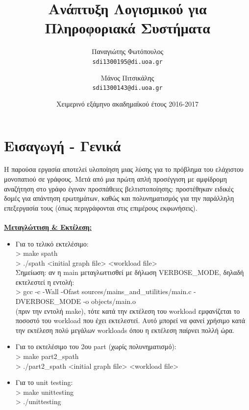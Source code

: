 \documentclass[11pt]{article}
\title{Ανάπτυξη Λογισμικού για Πληροφοριακά Συστήματα}
\author{Παναγιώτης Φωτόπουλος\\
  \texttt{sdi1300195@di.uoa.gr}
  \and Μάνος Πιτσικάλης\\
  \texttt{sdi1300143@di.uoa.gr}}
\date{Χειμερινό εξάμηνο ακαδημαϊκού έτους 2016-2017}
\begin{document}
\maketitle


\section{Εισαγωγή - Γενικά}
Η παρούσα εργασία αποτελεί υλοποίηση μιας λύσης για το πρόβλημα του ελάχιστου μονοπατιού σε γράφους. Μετά από μια πρώτη απλή προσέγγιση με αμφίδρομη αναζήτηση στο γράφο έγιναν προσπάθειες βελτιστοποίησης: προστέθηκαν ειδικές δομές για απάντηση ερωτημάτων, καθώς και πολυνηματισμός για την παράλληλη επεξεργασία τους (όπως περιγράφονται στις επιμέρους εκφωνήσεις).\\\\
\textbf{\underline{Μεταγλώττιση \& Εκτέλεση:}}
\begin{itemize}
\item Για το τελικό εκτελέσιμο:\\
> make spath\\
> ./spath <initial graph file> <workload file>\\
Σημείωση: αν η main μεταγλωττισθεί με δήλωση VERBOSE\_MODE, δηλαδή εκτελεστεί η εντολή: \\
> gcc -c -Wall -Ofast sources/mains\_and\_utilities/main.c -DVERBOSE\_MODE -o objects/main.o\\
(πριν την εντολή make), τότε κατά την εκτέλεση του workload εμφανίζεται το ποσοστό του workload που έχει εκτελεστεί. Αυτό μπορεί να φανεί χρήσιμο κατά την εκτέλεση πολύ μεγάλων workloads όπου η εκτέλεση παίρνει πολλή ώρα.
\item Για το εκτελέσιμο του 2ου part (χωρίς πολυνηματισμό):\\
> make part2\_spath\\
> ./part2\_spath <initial graph file> <workload file>
\item Για το unit testing:\\
> make unittesting\\
> ./unittesting
\end{itemize}
\end{document}
